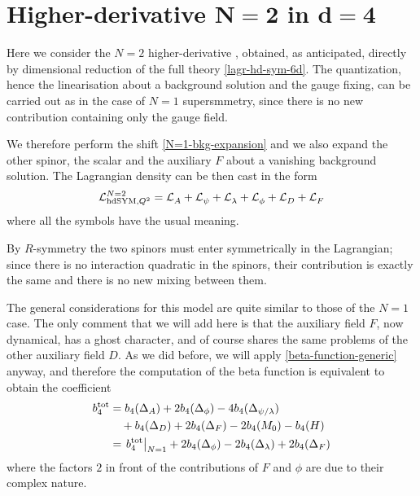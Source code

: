\section[Higher-derivative \texorpdfstring{${ N=2}$}{N=1} \sym{} in \texorpdfstring{${ d=4}$}{d=4}]{Higher-derivative \texorpdfstring{$\boldsymbol{ N=2}$}{N=1} \sym{} in \texorpdfstring{$\boldsymbol{ d=4}$}{d=4}}




Here we consider the $N=2$ higher-derivative \sym{}, obtained, as anticipated, directly by dimensional reduction of the full theory \eqref{lagr-hd-sym-6d}.
The quantization, hence the linearisation about a background solution and the gauge fixing, can be carried out as in the case of $N=1$ supersmmetry, since there is no new contribution containing only the gauge field.


We therefore perform the shift \eqref{N=1-bkg-expansion} and we also expand the other spinor, the scalar and the auxiliary $F$ about a vanishing background solution.
The Lagrangian density  can be then cast in the form
\begin{equation}\label{lagr-quadr-N=2}
{ \mathcal{L} }^{N = 2}_{{ \text{hd} }{ \text{SYM} }, Q^2}
	=
{ \mathcal{L} }^{  }_A
+
{ \mathcal{L} }^{  }_\psi
+
{ \mathcal{L} }^{  }_\lambda
+
{ \mathcal{L} }^{  }_\phi
+
{ \mathcal{L} }^{  }_D
+
{ \mathcal{L} }^{  }_F
\end{equation}
where all the symbols have the usual meaning.


By $R$-symmetry the two spinors must enter symmetrically in the Lagrangian; since there is no interaction quadratic in the spinors, their contribution is exactly the same and there is no new mixing between them.



The general considerations for this model are quite similar to those of the $N=1$ case. The only comment that we will add here is that the auxiliary field $F$, now dynamical, has a ghost character, and of course shares the same problems of the other auxiliary field $D$. As we did before, we will apply \eqref{beta-function-generic} anyway, and therefore the computation of the beta function is equivalent to obtain the coefficient
\begin{equation}\label{b4-N=2}
\begin{split}
b_4^{ \text{tot} }
&	=
b_4(\Delta_A)
+
2 b_4(\Delta_\phi)
-
4 b_4(\Delta_{\psi/\lambda})
\\
& \quad
+
b_4(\Delta_D)
+
2 b_4(\Delta_F)
-
2 b_4(M_0)
-
b_4(H)\\
& =
\left.b_4^{ \text{tot} }\right|_{ N = 1 }
+
2 b_4(\Delta_\phi)
-
2 b_4(\Delta_\lambda)
+
2 b_4(\Delta_F)
\end{split}
\end{equation}
where the factors $2$ in front of the contributions of $F$ and $\phi$ are due to their complex nature.

